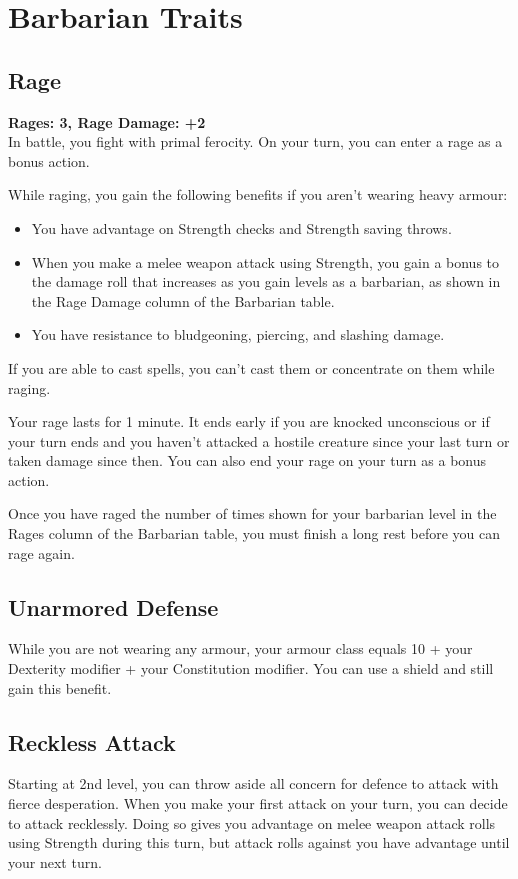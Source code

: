 {\section*{Barbarian Traits}
\subsection*{Rage}
\textbf{Rages: 3, Rage Damage: +2}\\
In battle, you fight with primal ferocity. On your turn, you can enter a rage as a bonus action.

While raging, you gain the following benefits if you aren't wearing heavy armour:

\begin{itemize}
	\item You have advantage on Strength checks and Strength saving throws.
	\item When you make a melee weapon attack using Strength, you gain a bonus to the damage roll that increases as you gain levels as a barbarian, as shown in the Rage Damage column of the Barbarian table.
	\item You have resistance to bludgeoning, piercing, and slashing damage.
\end{itemize}
If you are able to cast spells, you can't cast them or concentrate on them while raging.

Your rage lasts for 1 minute. It ends early if you are knocked unconscious or if your turn ends and you haven't attacked a hostile creature since your last turn or taken damage since then. You can also end your rage on your turn as a bonus action.

Once you have raged the number of times shown for your barbarian level in the Rages column of the Barbarian table, you must finish a long rest before you can rage again.
\subsection*{Unarmored Defense}
While you are not wearing any armour, your armour class equals 10 + your Dexterity modifier + your Constitution modifier. You can use a shield and still gain this benefit.
\subsection*{Reckless Attack}
Starting at 2nd level, you can throw aside all concern for defence to attack with fierce desperation. When you make your first attack on your turn, you can decide to attack recklessly. Doing so gives you advantage on melee weapon attack rolls using Strength during this turn, but attack rolls against you have advantage until your next turn.
}
